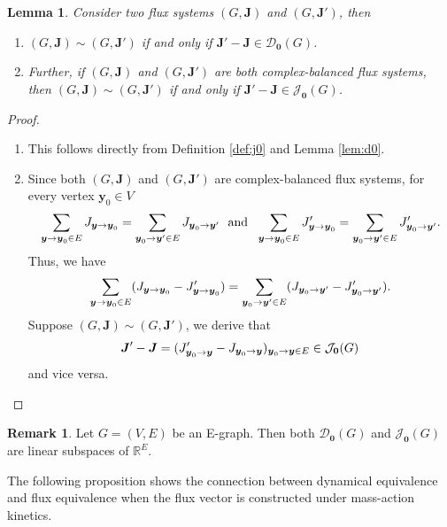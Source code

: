 \documentclass[11pt]{article}
\theoremstyle{plain}
\newtheorem{lemma}[theorem]{Lemma}
\theoremstyle{definition}
\newtheorem{remark}[theorem]{Remark}
\theoremstyle{remark}
\newcommand\RR{\mathbb{R}}
\newcommand\by{\boldsymbol{y}}
\newcommand\bJ{\boldsymbol{J}}
\newcommand{\eJ}{\mathcal{J}_{\textbf{0}}}
\newcommand{\mD}{\mathcal{D}_{\textbf{0}}}
\begin{document}
\begin{lemma}
\label{lem:j0}
Consider two flux systems $(G, \bJ)$ and $(G, \bJ')$, then
\begin{enumerate}
\item[(a)] $(G, \bJ) \sim (G, \bJ')$ if and only if $\bJ' - \bJ \in \mD (G)$.

\item[(b)] Further, if $(G, \bJ)$ and $(G, \bJ')$ are both complex-balanced flux systems, then $(G, \bJ) \sim (G, \bJ')$ if and only if $\bJ' - \bJ \in \eJ(G)$.
\end{enumerate} 
\end{lemma}

\begin{proof}
\begin{enumerate}
\item[(a)] This follows directly from Definition \ref{def:j0} and Lemma \ref{lem:d0}.

\item[(b)] Since both $(G, \bJ)$ and $(G, \bJ')$ are complex-balanced flux systems, for every vertex $\by_0 \in V$
\begin{equation} \notag
\sum_{\by \to \by_0 \in E} J_{\by \to \by_0} 
= \sum_{\by_0 \to \by' \in E} J_{\by_0 \to \by'}
\ \text{ and } \ 
\sum_{\by \to \by_0 \in E} J'_{\by \to \by_0} 
= \sum_{\by_0 \to \by' \in E} J'_{\by_0 \to \by'}.
\end{equation}
Thus, we have
\begin{equation} \notag
\sum_{\by \to \by_0 \in E} (J_{\by \to \by_0} - J'_{\by \to \by_0})
= \sum_{\by_0 \to \by' \in E} (J_{\by_0 \to \by'} - J'_{\by_0 \to \by'}).
\end{equation}
Suppose $(G, \bJ) \sim (G, \bJ')$, we derive that
\begin{equation} \notag
\bJ' - \bJ = (J'_{\by_0  \to \by} - J_{\by_0  \to \by})_{\by_0  \to \by \in E} \in \eJ(G)
\end{equation}
and vice versa.
\end{enumerate}
\end{proof}

\begin{remark}
\label{rmk:linear_subspace}
Let $G=(V, E)$ be an E-graph. Then both
$\mD (G)$ and $\eJ(G)$ are linear subspaces of $\RR^E$.
\end{remark}

\medskip

The following proposition shows the connection between dynamical equivalence and flux equivalence when the flux vector is constructed under mass-action kinetics.
\end{document}
